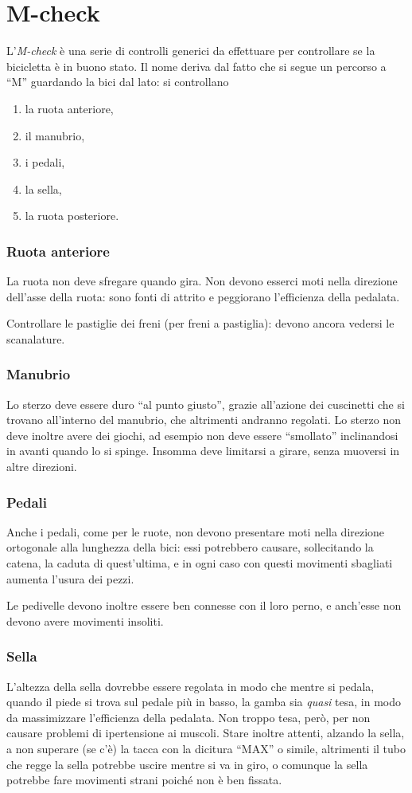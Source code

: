 \chapter{M-check}
L'\textit{M-check} è una serie di controlli generici da effettuare per controllare se la bicicletta è in buono stato.
Il nome deriva dal fatto che si segue un percorso a ``M'' guardando la bici dal lato: si controllano
\begin{enumerate}
  \item la ruota anteriore,
  \item il manubrio,
  \item i pedali,
  \item la sella,
  \item la ruota posteriore.
\end{enumerate}

\subsection*{Ruota anteriore}
La ruota non deve sfregare quando gira.
Non devono esserci moti nella direzione dell'asse della ruota: sono fonti di attrito e peggiorano l'efficienza della pedalata.

Controllare le pastiglie dei freni (per freni a pastiglia): devono ancora vedersi le scanalature.

\subsection*{Manubrio}
Lo sterzo deve essere duro ``al punto giusto'', grazie all'azione dei cuscinetti che si trovano all'interno del manubrio, che altrimenti andranno regolati.
Lo sterzo non deve inoltre avere dei giochi, ad esempio non deve essere ``smollato'' inclinandosi in avanti quando lo si spinge.
Insomma deve limitarsi a girare, senza muoversi in altre direzioni.

\subsection*{Pedali}
Anche i pedali, come per le ruote, non devono presentare moti nella direzione ortogonale alla lunghezza della bici: essi potrebbero causare, sollecitando la catena, la caduta di quest'ultima, e in ogni caso con questi movimenti sbagliati aumenta l'usura dei pezzi.

Le pedivelle devono inoltre essere ben connesse con il loro perno, e anch'esse non devono avere movimenti insoliti.

\subsection*{Sella}
L'altezza della sella dovrebbe essere regolata in modo che mentre si pedala, quando il piede si trova sul pedale più in basso, la gamba sia \emph{quasi} tesa, in modo da massimizzare l'efficienza della pedalata. Non troppo tesa, però, per non causare problemi di ipertensione ai muscoli.
Stare inoltre attenti, alzando la sella, a non superare (se c'è) la tacca con la dicitura ``MAX'' o simile, altrimenti il tubo che regge la sella potrebbe uscire mentre si va in giro, o comunque la sella potrebbe fare movimenti strani poiché non è ben fissata.
